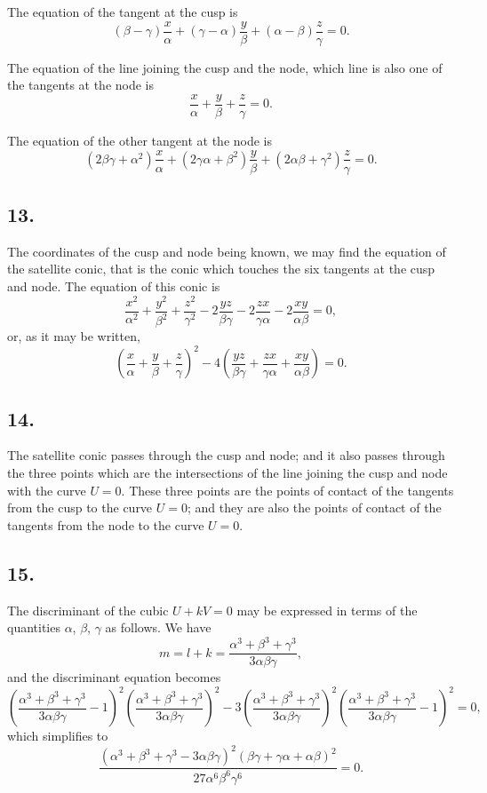 \documentclass[11pt,a4paper]{article}
\theoremstyle{definition}
\begin{document}
The equation of the tangent at the cusp is
\[
(\beta - \gamma)\frac{x}{\alpha} + (\gamma - \alpha)\frac{y}{\beta} + (\alpha - \beta)\frac{z}{\gamma} = 0.
\]

The equation of the line joining the cusp and the node, which line is also one of
the tangents at the node is
\[
\frac{x}{\alpha} + \frac{y}{\beta} + \frac{z}{\gamma} = 0.
\]

The equation of the other tangent at the node is
\[
(2\beta\gamma + \alpha^{2})\frac{x}{\alpha} + (2\gamma\alpha + \beta^{2})\frac{y}{\beta} + (2\alpha\beta + \gamma^{2})\frac{z}{\gamma} = 0.
\]

\newpage
\subsection*{13.}

The coordinates of the cusp and node being known, we may find the equation of
the satellite conic, that is the conic which touches the six tangents at the cusp and node.
The equation of this conic is
\[
\frac{x^{2}}{\alpha^{2}} + \frac{y^{2}}{\beta^{2}} + \frac{z^{2}}{\gamma^{2}}
- 2\frac{yz}{\beta\gamma} - 2\frac{zx}{\gamma\alpha} - 2\frac{xy}{\alpha\beta} = 0,
\]
or, as it may be written,
\[
\left(\frac{x}{\alpha} + \frac{y}{\beta} + \frac{z}{\gamma}\right)^{2}
- 4\left(\frac{yz}{\beta\gamma} + \frac{zx}{\gamma\alpha} + \frac{xy}{\alpha\beta}\right) = 0.
\]

\subsection*{14.}

The satellite conic passes through the cusp and node; and it also passes through
the three points which are the intersections of the line joining the cusp and node with
the curve $U = 0$. These three points are the points of contact of the tangents from the
cusp to the curve $U = 0$; and they are also the points of contact of the tangents from
the node to the curve $U = 0$.

\newpage
\subsection*{15.}

The discriminant of the cubic $U + kV = 0$ may be expressed in terms of the
quantities $\alpha$, $\beta$, $\gamma$ as follows. We have
\[
m = l + k = \frac{\alpha^{3} + \beta^{3} + \gamma^{3}}{3\alpha\beta\gamma},
\]
and the discriminant equation becomes
\[
\left(\frac{\alpha^{3} + \beta^{3} + \gamma^{3}}{3\alpha\beta\gamma} - 1\right)^{2}
\left(\frac{\alpha^{3} + \beta^{3} + \gamma^{3}}{3\alpha\beta\gamma}\right)^{2}
- 3\left(\frac{\alpha^{3} + \beta^{3} + \gamma^{3}}{3\alpha\beta\gamma}\right)^{2}
\left(\frac{\alpha^{3} + \beta^{3} + \gamma^{3}}{3\alpha\beta\gamma} - 1\right)^{2} = 0,
\]
which simplifies to
\[
\frac{(\alpha^{3} + \beta^{3} + \gamma^{3} - 3\alpha\beta\gamma)^{2}(\beta\gamma + \gamma\alpha + \alpha\beta)^{2}}{27\alpha^{6}\beta^{6}\gamma^{6}} = 0.
\]
\end{document}
